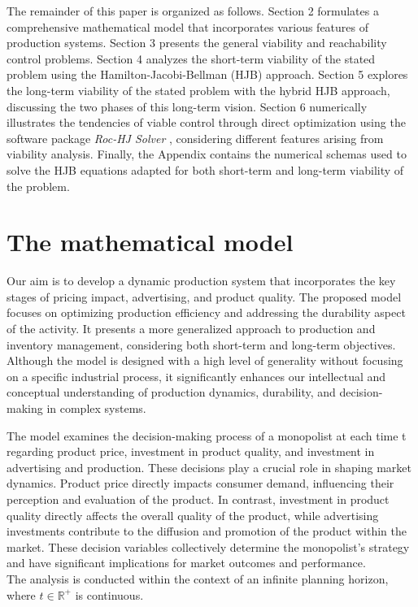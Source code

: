 \documentclass[]{interact}
\theoremstyle{plain}%
\theoremstyle{definition}
\theoremstyle{remark}
\begin{document}
The remainder of this paper is organized as follows. Section 2 formulates a comprehensive mathematical model that incorporates various features of production systems. Section 3 presents the general viability and reachability control problems. Section 4 analyzes the short-term viability of the stated problem using the Hamilton-Jacobi-Bellman (HJB) approach. Section 5 explores the long-term viability of the stated problem with the hybrid HJB approach, discussing the two phases of this long-term vision. Section 6 numerically illustrates the tendencies of viable control through direct optimization using the software package \textit{Roc-HJ Solver} \cite{RocHJ}, considering different features arising from viability analysis. Finally, the Appendix contains the numerical schemas used to solve the HJB equations adapted for both short-term and long-term viability of the problem. 
 
\section{The mathematical model}\label{model}
Our aim is to develop a dynamic production system that incorporates the key stages of pricing impact, advertising, and product quality. The proposed model focuses on optimizing production efficiency and addressing the durability aspect of the activity. It presents a more generalized approach to production and inventory management, considering both short-term and long-term objectives. Although the model is designed with a high level of generality without focusing on a specific industrial process, it significantly enhances our intellectual and conceptual understanding of production dynamics, durability, and decision-making in complex systems.


The model examines the decision-making process of a monopolist at each time t regarding product price, investment in product quality, and investment in advertising and production. These decisions play a crucial role in shaping market dynamics. Product price directly impacts consumer demand, influencing their perception and evaluation of the product. In contrast, investment in product quality directly affects the overall quality of the product, while advertising investments contribute to the diffusion and promotion of the product within the market. These decision variables collectively determine the monopolist's strategy and have significant implications for market outcomes and performance.\\
The analysis is conducted within the context of an infinite planning horizon, where $t\in \mathbb{R}^{+}$ is continuous.
\end{document}
